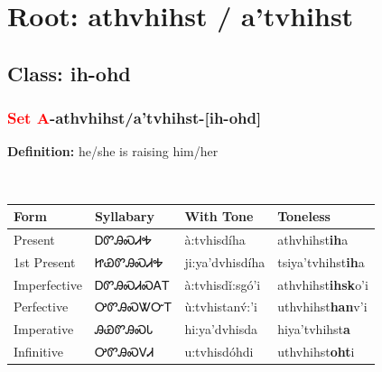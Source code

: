 \needspace{4in}
\section*{Root: athvhihst / a'tvhihst}
\nopagebreak
{}
\needspace{3in}
\subsection*{Class: ih-ohd}
\nopagebreak
\needspace{2in}
\subsubsection*{\textcolor{Red}{Set A}{-}\textbf{athvhihst/a'tvhihst}{-}[ih-ohd]}
\nopagebreak
\textbf{Definition: } he/she is raising him/her
\\[0.5em]
\begin{tabularx}{\textwidth}{l X X X}%
\toprule%
\textbf{Form}&\textbf{Syllabary}&\textbf{With Tone}&\textbf{Toneless}\\%
\midrule%
Present&ᎠᏛᎯᏍᏗᎭ&à:tvhisdíha&athvhihst\textbf{ih}a\\%
1st Present&ᏥᏯᏛᎯᏍᏗᎭ&ji:ya’dvhisdíha&tsiya'tvhihst\textbf{ih}a\\%
Imperfective&ᎠᏛᎯᏍᏗᏍᎪᎢ&à:tvhisdǐ:sgó’i&athvhihst\textbf{ihsk}o'i\\%
Perfective&ᎤᏛᎯᏍᏔᏅᎢ&ù:tvhistanv́:’i&uthvhihst\textbf{han}v'i\\%
Imperative&ᎯᏯᏛᎯᏍᏓ&hi:ya’dvhisda&hiya'tvhihst\textbf{a}\\%
Infinitive&ᎤᏛᎯᏍᏙᏗ&u:tvhisdóhdi&uthvhihst\textbf{oht}i\\%
\bottomrule%
\end{tabularx}
\\[1em]